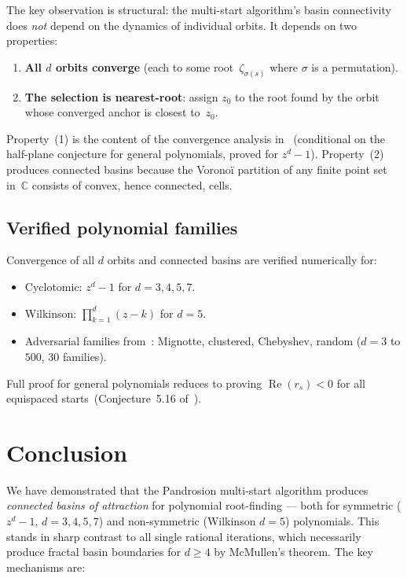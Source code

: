 \documentclass[11pt,a4paper]{article}
\theoremstyle{definition}
\theoremstyle{remark}
\begin{document}
The key observation is structural: the multi-start algorithm's basin connectivity does \emph{not} depend on the dynamics of individual orbits.  It depends on two properties:
\begin{enumerate}[nosep]
\item \textbf{All $d$ orbits converge} (each to some root~$\zeta_{\sigma(s)}$ where $\sigma$ is a permutation).
\item \textbf{The selection is nearest-root}: assign $z_0$ to the root found by the orbit whose converged anchor is closest to~$z_0$.
\end{enumerate}
Property~(1) is the content of the convergence analysis in~\cite{Besevic2026g} (conditional on the half-plane conjecture for general polynomials, proved for $z^d - 1$).  Property~(2) produces connected basins because the Vorono\"i partition of any finite point set in~$\mathbb{C}$ consists of convex, hence connected, cells.

\subsection{Verified polynomial families}

Convergence of all $d$ orbits and connected basins are verified numerically for:
\begin{itemize}[nosep]
\item Cyclotomic: $z^d - 1$ for $d = 3, 4, 5, 7$.
\item Wilkinson: $\prod_{k=1}^d (z - k)$ for $d = 5$.
\item Adversarial families from~\cite{Besevic2026g}: Mignotte, clustered, Chebyshev, random ($d = 3$ to $500$, $30$ families).
\end{itemize}
Full proof for general polynomials reduces to proving $\operatorname{Re}(r_s) < 0$ for all equispaced starts~(Conjecture~5.16 of~\cite{Besevic2026g}).

\section{Conclusion}
\label{sec:conclusion}

We have demonstrated that the Pandrosion multi-start algorithm produces \emph{connected basins of attraction} for polynomial root-finding --- both for symmetric ($z^d - 1$, $d = 3, 4, 5, 7$) and non-symmetric (Wilkinson $d = 5$) polynomials.  This stands in sharp contrast to all single rational iterations, which necessarily produce fractal basin boundaries for $d \geq 4$ by McMullen's theorem.  The key mechanisms are:
\end{document}
